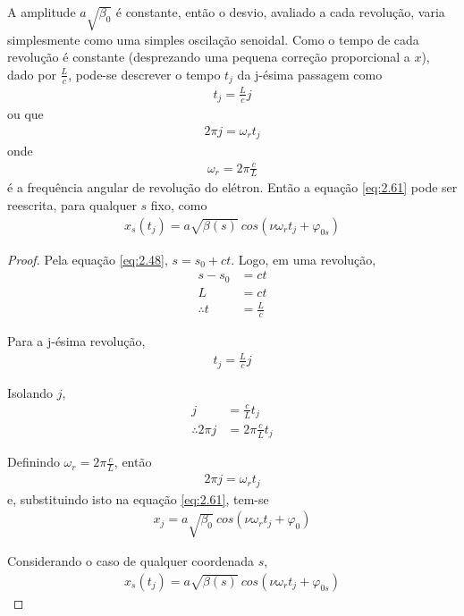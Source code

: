A amplitude $a\sqrt{\beta_0}$ é constante, então o desvio, avaliado a cada revolução, varia simplesmente como uma simples oscilação senoidal. Como o tempo de cada revolução é constante (desprezando uma pequena correção proporcional a $x$), dado por $\frac{L}{c}$, pode-se descrever o tempo $t_j$ da j-ésima passagem como
\begin{align}
	t_j = \frac{L}{c}j
\end{align}
ou que
\begin{align}
	2\pi j = \omega_r t_j
\end{align}
onde
\begin{align}
	\omega_r = 2\pi \frac{c}{L}
\end{align}
é a frequência angular de revolução do elétron. Então a equação \eqref{eq:2.61} pode ser reescrita, para qualquer $s$ fixo, como
\begin{align}
	x_s (t_j) = a\sqrt{\beta(s)}\ cos(\nu \omega_r t_j + \varphi_{0s})\label{eq:2.64}
\end{align}

\begin{proof}
	Pela equação \eqref{eq:2.48}, $s = s_0 + ct$. Logo, em uma revolução,
	\begin{align*}
		s-s_0 &= ct\\
		L &= ct\\
		\therefore t &= \frac{L}{c}
	\end{align*}
	
	Para a j-ésima revolução,
	\begin{align*}
		t_j = \frac{L}{c}j
	\end{align*}
	
	Isolando $j$,
	\begin{align*}
		j &= \frac{c}{L} t_j\\
		\therefore 2\pi j &= 2\pi \frac{c}{L} t_j
	\end{align*}
	
	Definindo $\omega_r = 2\pi \frac{c}{L}$, então
	\begin{align*}
		2\pi j = \omega_r t_j
	\end{align*}
	e, substituindo isto na equação \eqref{eq:2.61}, tem-se
	\begin{align*}
		x_j = a\sqrt{\beta_0}\ cos(\nu \omega_r t_j + \varphi_{0})
	\end{align*}
	
	Considerando o caso de qualquer coordenada $s$,
	\begin{align*}
		x_s (t_j) = a\sqrt{\beta(s)}\ cos(\nu \omega_r t_j + \varphi_{0s})
	\end{align*}
\end{proof}

